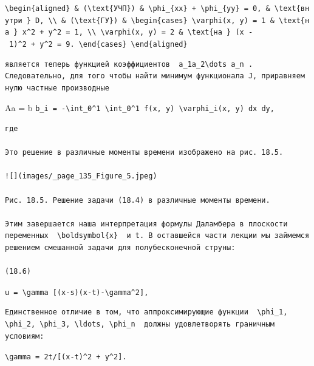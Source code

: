 \documentclass[
  ukrainian,
]{article}
\begin{document}
\texttt{\textbackslash{}begin\{aligned\}\ \&\ (\textbackslash{}text\{УЧП\})\ \&\ \textbackslash{}phi\_\{xx\}\ +\ \textbackslash{}phi\_\{yy\}\ =\ 0,\ \&\ \textbackslash{}text\{внутри\ \}\ D,\ \textbackslash{}\textbackslash{}\ \&\ (\textbackslash{}text\{ГУ\})\ \&\ \textbackslash{}begin\{cases\}\ \textbackslash{}varphi(x,\ y)\ =\ 1\ \&\ \textbackslash{}text\{на\ \}\ x\^{}2\ +\ y\^{}2\ =\ 1,\ \textbackslash{}\textbackslash{}\ \textbackslash{}varphi(x,\ y)\ =\ 2\ \&\ \textbackslash{}text\{на\ \}\ (x\ -\ 1)\^{}2\ +\ y\^{}2\ =\ 9.\ \textbackslash{}end\{cases\}\ \textbackslash{}end\{aligned\}}

\begin{verbatim}
является теперь функцией коэффициентов  a_1a_2\dots a_n . Следовательно, для того чтобы найти минимум функционала J, приравняем нулю частные производные
\end{verbatim}

Aa = b
\texttt{b\_i\ =\ -\textbackslash{}int\_0\^{}1\ \textbackslash{}int\_0\^{}1\ f(x,\ y)\ \textbackslash{}varphi\_i(x,\ y)\ dx\ dy,}

\begin{verbatim}
где

Это решение в различные моменты времени изображено на рис. 18.5.

![](images/_page_135_Figure_5.jpeg)

Рис. 18.5. Решение задачи (18.4) в различные моменты времени.

Этим завершается наша интерпретация формулы Даламбера в плоскости переменных  \boldsymbol{x}  и t. В оставшейся части лекции мы займемся решением смешанной задачи для полубесконечной струны:

(18.6)
\end{verbatim}

\texttt{u\ =\ \textbackslash{}gamma\ {[}(x-s)(x-t)-\textbackslash{}gamma\^{}2{]},}

\begin{verbatim}
Единственное отличие в том, что аппроксимирующие функции  \phi_1, \phi_2, \phi_3, \ldots, \phi_n  должны удовлетворять граничным условиям:
\end{verbatim}

\texttt{\textbackslash{}gamma\ =\ 2t/{[}(x-t)\^{}2\ +\ y\^{}2{]}.}
\end{document}
